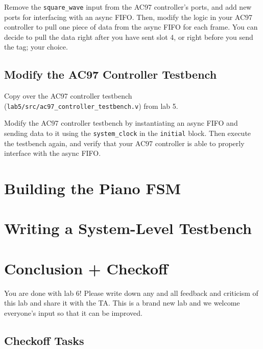 \documentclass[11pt]{article}
\begin{document}
Remove the \verb|square_wave| input from the AC97 controller's ports, and add new ports for interfacing with an async FIFO. Then, modify the logic in your AC97 controller to pull one piece of data from the async FIFO for each frame. You can decide to pull the data right after you have sent slot 4, or right before you send the tag; your choice.

\subsection{Modify the AC97 Controller Testbench}
Copy over the AC97 controller testbench (\verb|lab5/src/ac97_controller_testbench.v|) from lab 5.

Modify the AC97 controller testbench by instantiating an async FIFO and sending data to it using the \verb|system_clock| in the \verb|initial| block. Then execute the testbench again, and verify that your AC97 controller is able to properly interface with the async FIFO.

\section{Building the Piano FSM}



\section{Writing a System-Level Testbench}



\section{Conclusion + Checkoff}
You are done with lab 6! Please write down any and all feedback and criticism of this lab and share it with the TA. This is a brand new lab and we welcome everyone's input so that it can be improved.


\subsection{Checkoff Tasks}
\end{document}
